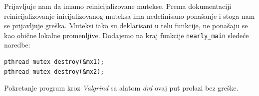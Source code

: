 Prijavljuje nam da imamo reinicijalizovane mutekse. Prema dokumentaciji reinicijalizovanje inicijalizovanog muteksa ima nedefinisano ponašanje i stoga nam se prijavljuje greška. Muteksi iako su deklarisani u telu funkcije, ne ponašaju se kao obične lokalne promenljive. Dodajemo na kraj funkcije \texttt{nearly\_main} sledeće naredbe:

\begin{verbatim}
pthread_mutex_destroy(&mx1);
pthread_mutex_destroy(&mx2);
\end{verbatim}

Pokretanje program kroz \emph{Valgrind} sa alatom \emph{drd} ovaj put prolazi bez greške.
